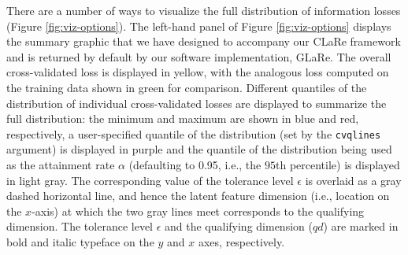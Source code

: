 
There are a number of ways to visualize the full distribution of information losses (Figure \ref{fig:viz-options}). 
The left-hand panel of Figure \ref{fig:viz-options} displays the summary graphic that we have designed to accompany our CLaRe framework and is returned by default by our software implementation, GLaRe.
The overall cross-validated loss is displayed in yellow, with the analogous loss computed on the training data shown in green for comparison.
Different quantiles of the distribution of individual cross-validated losses are displayed to summarize the full distribution: the minimum and maximum are shown in blue and red, respectively, a user-specified quantile of the distribution (set by the \texttt{cvqlines} argument) is displayed in purple and the quantile of the distribution being used as the attainment rate $\alpha$ (defaulting to 0.95, i.e., the $95$th percentile) is displayed in light gray.
The corresponding value of the tolerance level $\epsilon$ is overlaid as a gray dashed horizontal line, and hence the latent feature dimension (i.e., location on the $x$-axis) at which the two gray lines meet corresponds to the qualifying dimension.
The tolerance level $\epsilon$ and the qualifying dimension ($qd$) are marked in bold and italic typeface on the $y$ and $x$ axes, respectively.

